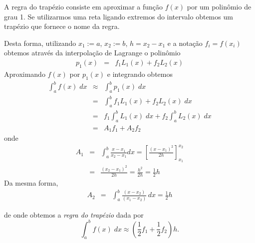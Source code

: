 A regra do trapézio consiste em aproximar a função $f(x)$ por um polinômio de grau 1. Se utilizarmos uma reta ligando extremos do intervalo obtemos um trapézio que fornece o nome da regra.


Desta forma, utilizando $x_1:=a$,  $x_2:=b$, $h=x_2-x_1$ e a notação $f_i=f(x_i)$ obtemos através da interpolação de Lagrange o polinômio
\begin{eqnarray}
p_1(x) &=& f_1 L_1(x)+ f_2 L_2(x)
\end{eqnarray}
Aproximando $f(x)$ por $p_1(x)$ e integrando obtemos
\begin{eqnarray*}
  \int_a^bf(x)\;dx &\approx& \int_a^bp_1(x)\;dx \\
    &=& \int_a^b f_1L_1(x) + f_2L_2(x)\;dx \\
    &=& f_1 \int_a^b L_1(x)\;dx + f_2 \int_a^b L_2(x)\;dx \\
    &=& A_1 f_1 + A_2 f_2
\end{eqnarray*}
onde
\begin{eqnarray*}
  A_1 &=& \int_a^b\frac{x-x_1}{x_2-x_1}dx =  \left[\frac{(x-x_1)^2}{2h}\right]_{x_1}^{x_2}\\
      &=& \frac{(x_2-x_1)^2}{2h} = \frac{h^2}{2h} = \frac{1}{2}h
\end{eqnarray*}
Da mesma forma,
\begin{eqnarray*}
  A_2 &=& \int_a^b\frac{(x-x_2)}{(x_1-x_2)}\,dx = \frac{1}{2}h
\end{eqnarray*}


de onde obtemos a \emph{regra do trapézio} dada por
\begin{equation}
  \int_a^b f(x)\;dx \approx \left(\frac{1}{2}f_1 + \frac{1}{2}f_2\right)h.
\end{equation}


